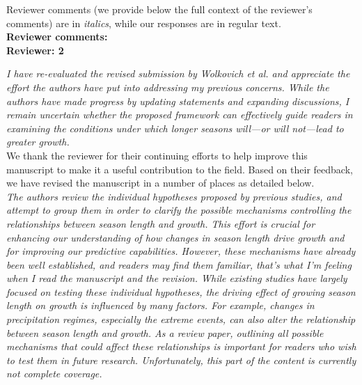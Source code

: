 \documentclass[11pt]{article}
\begin{document}
\setlength{\parindent}{0cm}
\setlength{\parskip}{7pt}


\lrenewcommand{\lrefname}{\CHead{}}

Reviewer comments (we provide below the full context of the reviewer's comments) are in \emph{italics}, while our responses are in regular text. \\ 

{\bf Reviewer comments:} \\

{\bf Reviewer: 2}

\emph{I have re-evaluated the revised submission by Wolkovich et al. and appreciate the effort the authors have put into addressing my previous concerns. While the authors have made progress by updating statements and expanding discussions, I remain uncertain whether the proposed framework can effectively guide readers in examining the conditions under which longer seasons will---or will not---lead to greater growth.}\\

We thank the reviewer for their continuing efforts to help improve this manuscript to make it a useful contribution to the field. Based on their feedback, we have revised the manuscript in a number of places as detailed below. \\

\emph{The authors review the individual hypotheses proposed by previous studies, and attempt to group them in order to clarify the possible mechanisms controlling the relationships between season length and growth. This effort is crucial for enhancing our understanding of how changes in season length drive growth and for improving our predictive capabilities. However, these mechanisms have already been well established, and readers may find them familiar, that’s what I’m feeling when I read the manuscript and the revision. While existing studies have largely focused on testing these individual hypotheses, the driving effect of growing season length on growth is influenced by many factors. For example, changes in precipitation regimes, especially the extreme events, can also alter the relationship between season length and growth. As a review paper, outlining all possible mechanisms that could affect these relationships is important for readers who wish to test them in future research. Unfortunately, this part of the content is currently not complete coverage.}\\
\end{document}
